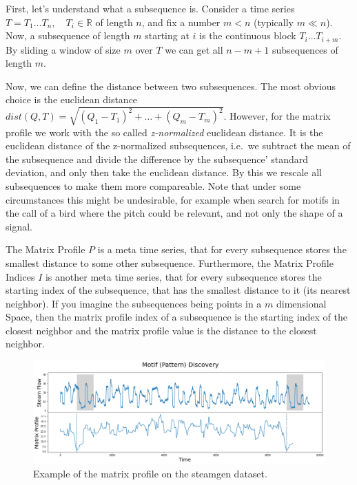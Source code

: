 \documentclass[12pt,a4paper]{article}
\begin{document}
First, let's understand what a subsequence is. Consider a time series \(T=T_1 \dots T_n,\quad T_i\in\mathbb{R}\) of length \(n\), and fix a number \(m < n\) (typically \(m \ll n\)). Now, a subsequence of length \(m\) starting at \(i\) is the continuous block \(T_i \dots T_{i+m}\). By sliding a window of size \(m\) over \(T\) we can get all \(n-m+1\) subsequences of length \(m\).

Now, we can define the distance between two subsequences. The most obvious choice is the euclidean distance
\(dist(Q, T) = \sqrt{\left(Q_1 - T_1\right)^2+\dots+\left(Q_m-T_m\right)^2}\). However, for the matrix profile we work with the so called
\emph{z-normalized} euclidean distance. It is the euclidean distance of the z-normalized subsequences, i.e.~we subtract the mean of the
subsequence and divide the difference by the subsequence' standard deviation, and only then take the euclidean distance. By this we rescale all subsequences to make them more compareable. Note that under some circumstances this might be undesirable, for example when search for motifs in the call of a bird where the pitch could be relevant, and not only the shape of a signal.

The Matrix Profile \(P\) is a meta time series, that for every subsequence stores the smallest distance to some other subsequence.
Furthermore, the Matrix Profile Indices \(I\) is another meta time series, that for every subsequence stores the starting index of the
subsequence, that has the smallest distance to it (its nearest neighbor). If you imagine the subsequences being points in a \(m\)
dimensional Space, then the matrix profile index of a subsequence is the starting index of the closest neighbor and the matrix profile value is the distance to the closest neighbor.

\begin{figure}
\centering
\includegraphics{images/MP_example.png}
\caption{Example of the matrix profile on the steamgen dataset.}
\end{figure}
\end{document}
